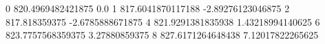 0 820.4969482421875 0.0
1 817.6041870117188 -2.89276123046875
2 817.818359375 -2.6785888671875
4 821.9291381835938 1.43218994140625
6 823.7757568359375 3.27880859375
8 827.6171264648438 7.12017822265625
